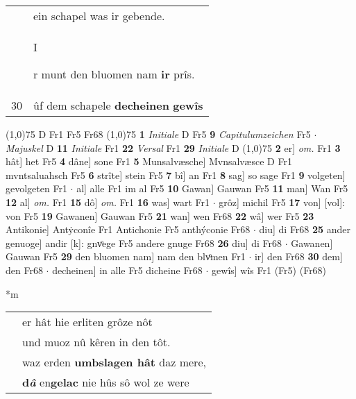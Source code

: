 \documentclass[8pt,a4paper,notitlepage]{article}
\begin{document}
\begin{table}[ht]
\begin{minipage}[t]{0.5\linewidth}
\begin{tabular}{rl}
 & ein schapel was ir gebende.\\ 
 & \begin{large}I\end{large}r munt den bluomen nam \textbf{ir} prîs.\\ 
30 & ûf dem schapele \textbf{decheinen} \textbf{gewîs}\\ 
\end{tabular}
\scriptsize
\line(1,0){75} \newline
D Fr1 Fr5 Fr68 \newline
\line(1,0){75} \newline
\textbf{1} \textit{Initiale} D Fr5  \textbf{9} \textit{Capitulumzeichen} Fr5   $\cdot$ \textit{Majuskel} D  \textbf{11} \textit{Initiale} Fr1  \textbf{22} \textit{Versal} Fr1  \textbf{29} \textit{Initiale} D  \newline
\line(1,0){75} \newline
\textbf{2} er] \textit{om.} Fr1 \textbf{3} hât] het Fr5 \textbf{4} dâne] sone Fr1 \textbf{5} Munsalvæsche] Mvnsalvæsce D Fr1 mvntsaluahsch Fr5 \textbf{6} strîte] stein Fr5 \textbf{7} bî] an Fr1 \textbf{8} sag] so sage Fr1 \textbf{9} volgeten] gevolgeten Fr1  $\cdot$ al] alle Fr1 im al Fr5 \textbf{10} Gawan] Gauwan Fr5 \textbf{11} man] Wan Fr5 \textbf{12} al] \textit{om.} Fr1 \textbf{15} dô] \textit{om.} Fr1 \textbf{16} was] wart Fr1  $\cdot$ grôz] michil Fr5 \textbf{17} von] [vol]: von Fr5 \textbf{19} Gawanen] Gauwan Fr5 \textbf{21} wan] wen Fr68 \textbf{22} wâ] wer Fr5 \textbf{23} Antikonie] Antẏconîe Fr1 Antichonie Fr5 anthýconie Fr68  $\cdot$ diu] di Fr68 \textbf{25} ander genuoge] andir [k]: gnvͦege Fr5 andere gnuge Fr68 \textbf{26} diu] di Fr68  $\cdot$ Gawanen] Gauwan Fr5 \textbf{29} den bluomen nam] nam den blvͦmen Fr1  $\cdot$ ir] den Fr68 \textbf{30} dem] den Fr68  $\cdot$ decheinen] in alle Fr5 dicheine Fr68  $\cdot$ gewîs] wîs Fr1 (Fr5) (Fr68) \newline
\end{minipage}
\hspace{0.5cm}
\begin{minipage}[t]{0.5\linewidth}
\small
\begin{center}*m
\end{center}
\begin{tabular}{rl}
 & er hât hie erliten grôze nôt\\ 
 & und muoz nû kêren in den tôt.\\ 
 & waz erden \textbf{umbslagen hât} daz mere,\\ 
 & \textbf{d\textit{â}} en\textbf{gelac} nie hûs sô wol ze were\\ 

\end{tabular}
\end{minipage}
\end{table}
\end{document}
